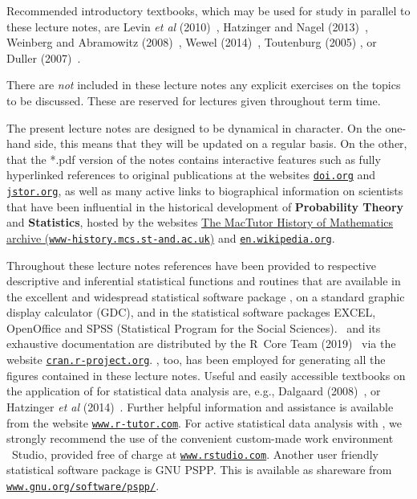 \medskip
\noindent
Recommended introductory textbooks, which may be used for study in 
parallel to these lecture notes, are Levin \textit{et al} 
(2010)~, Hatzinger and Nagel 
(2013)~, Weinberg and Abramowitz
(2008)~, Wewel (2014)~, Toutenburg 
(2005) , or Duller (2007)~.

\medskip
\noindent
There are \textit{not} included in these lecture notes any explicit 
exercises on the topics to be discussed. These are 
reserved for lectures given throughout term time.

\medskip
\noindent
The present lecture notes are designed to be dynamical in 
character. On the one-hand side, this means that they will be 
updated on a regular basis. On the other, that the *.pdf version 
of the notes contains interactive features such as fully 
hyperlinked references to original publications at the websites 
\href{https://doi.org}{\texttt{doi.org}} and 
\href{http://www.jstor.org}{\texttt{jstor.org}}, as well as many 
active links to biographical information on scientists that have 
been influential in the historical development of
\textbf{Probability Theory} and \textbf{Statistics}, hosted by the
websites \href{http://www-history.mcs.st-and.ac.uk/}{The MacTutor
History of Mathematics archive
({\tt www-history.mcs.st-and.ac.uk})} and
\href{http://en.wikipedia.org/wiki/Main_Page}{\texttt{en.wikipedia.org}}.

\medskip
\noindent
Throughout these lecture notes references have been provided to
respective descriptive and inferential statistical functions and
routines that are available in the excellent and widespread
statistical software package \R{}, on a standard graphic display
calculator (GDC), and in the statistical software packages EXCEL,
OpenOffice and SPSS (Statistical Program for the Social Sciences).
\R{}~and its exhaustive documentation are distributed by the
R~Core Team (2019)~ via the website
\href{http://cran.r-project.org}{\texttt{cran.r-project.org}}.
\R{}, too, has been employed for generating all the figures
contained in these lecture notes. Useful and easily accessible
textbooks on the application of \R{} for statistical data analysis
are, e.g., Dalgaard (2008)~, or Hatzinger \textit{et
al} (2014)~. Further helpful information and 
assistance is available from the website 
\href{http://www.r-tutor.com/}{\texttt{www.r-tutor.com}}. For
active statistical data analysis with \R{}, we strongly recommend
the use of the convenient custom-made work environment \R{}~Studio,
provided free of charge at \href{http://www.rstudio.com}{\texttt{www.rstudio.com}}. Another user friendly statistical software
package is GNU PSPP. This is available as shareware from 
\href{http://www.gnu.org/software/pspp/}{\texttt{www.gnu.org/software/pspp/}}.

